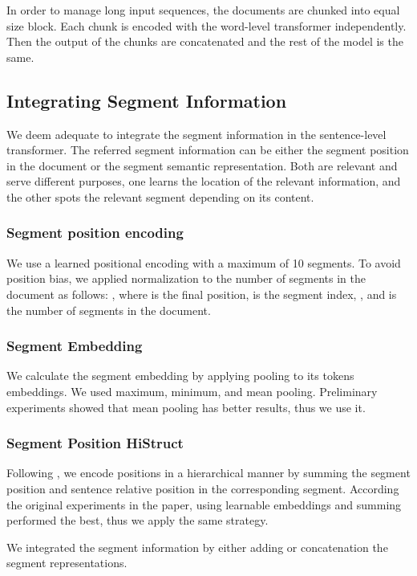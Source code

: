 \documentclass[sigconf]{acmart}
\begin{document}
In order to manage long input sequences, the documents are chunked into equal size block. Each chunk is encoded with the word-level transformer independently. Then the output of the chunks are concatenated and the rest of the model is the same. 

\subsection{Integrating Segment Information}
We deem adequate to integrate the segment information in the sentence-level transformer. The referred segment information can be either the segment position in the document or the segment semantic representation. Both are relevant and serve different purposes, one learns the location of the relevant information, and the other spots the relevant segment depending on its content. 

\subsubsection{Segment position encoding} 
We use a learned positional encoding with a maximum of 10 segments. To avoid position bias, we applied normalization to the number of segments in the document as follows: , where  is the final position,  is the segment index, , and  is the number of segments in the document. 

\subsubsection{Segment Embedding}
We calculate the segment embedding by applying pooling to its tokens embeddings. We used maximum, minimum, and mean pooling. Preliminary experiments showed that mean pooling has better results, thus we use it.

\subsubsection{Segment Position HiStruct} 
Following \cite{ruan-etal-2022-histruct}, we encode positions in a hierarchical manner by summing the segment position and sentence relative position in the corresponding segment. According the original experiments in the paper, using learnable embeddings and summing performed the best, thus we apply the same strategy.

We integrated the segment information by either adding or concatenation the segment representations.
\end{document}
